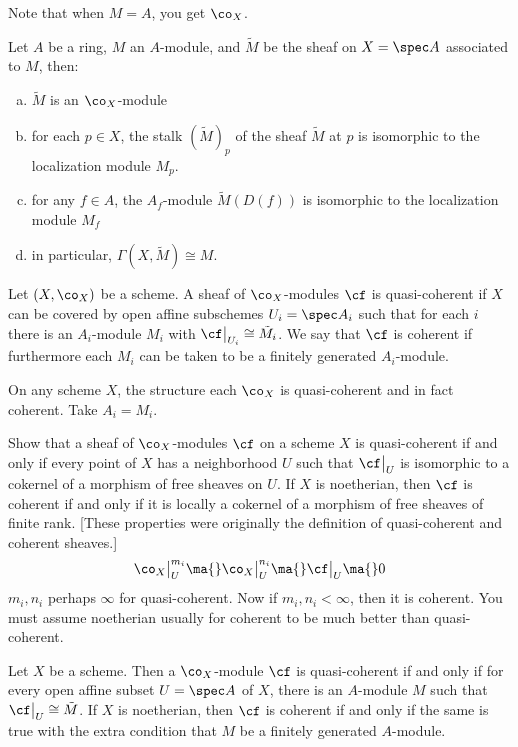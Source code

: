 Note that when $M=A$, you get $\co_X$. 

\begin{prop}
Let $A$ be a ring, $M$ an $A$-module, and $\tilde{M}$ be the sheaf on $X=\spec A$ associated to $M$, then:
	\begin{enumerate}[(a)]
	\item $\tilde{M}$ is an $\co_X$-module
	\item for each $p \in X$, the stalk $(\tilde{M})_p$ of the sheaf $\tilde{M}$ at $p$ is isomorphic to the localization module $M_p$. 
	\item for any $f \in A$, the $A_f$-module $\tilde{M}(D(f))$ is isomorphic to the localization module $M_f$
	\item in particular, $\Gamma(X,\tilde{M}) \cong M$.
	\end{enumerate}
\end{prop}


\begin{dfn}[Coherent]
Let $(X,\co_X)$ be a scheme. A sheaf of $\co_X$-modules $\cf$ is quasi-coherent if $X$ can be covered by open affine subschemes $U_i=\spec A_i$ such that for each $i$ there is an $A_i$-module $M_i$ with $\cf\big|_{U_i} \cong \tilde{M}_i$. We say that $\cf$ is coherent if furthermore each $M_i$ can be taken to be a finitely generated $A_i$-module. 
\end{dfn}


\begin{ex}
On any scheme $X$, the structure each $\co_X$ is quasi-coherent and in fact coherent. Take $A_i=M_i$.
\end{ex}


\begin{exc}
Show that a sheaf of $\co_X$-modules $\cf$ on a scheme $X$ is quasi-coherent if and only if every point of $X$ has a neighborhood $U$ such that $\cf\big|_U$ is isomorphic to a cokernel of a morphism of free sheaves on $U$. If $X$ is noetherian, then $\cf$ is coherent if and only if it is locally a cokernel of a morphism of free sheaves of finite rank. [These properties were originally the definition of quasi-coherent and coherent sheaves.] 
	\[
	\co_X\big|_{U}^{m_i} \ma{} \co_X\big|_{U}^{n_i} \ma{} \cf\big|_U \ma{} 0
	\]
$m_i,n_i$ perhaps $\infty$ for quasi-coherent. Now if $m_i,n_i<\infty$, then it is coherent. You must assume noetherian usually for coherent to be much better than quasi-coherent.
\end{exc}


\begin{prop}
Let $X$ be a scheme. Then a $\co_X$-module $\cf$ is quasi-coherent if and only if for every open affine subset $U=\spec A$ of $X$, there is an $A$-module $M$ such that $\cf\big|_U \cong \tilde{M}$. If $X$ is noetherian, then $\cf$ is coherent if and only if the same is true with the extra condition that $M$ be a finitely generated $A$-module. 
\end{prop}


